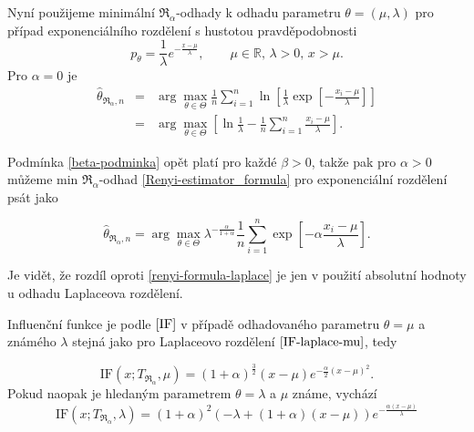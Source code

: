 Nyní použijeme minimální $\mathfrak{R}_\alpha$-odhady k odhadu parametru $\theta = (\mu,\lambda)$ pro případ exponenciálního rozdělení s hustotou pravděpodobnosti
\begin{equation}
	p_\theta = \frac{1}{\lambda} e^{-\frac{x-\mu}{\lambda}}, \qquad \mu\in \mathbb{R},\, \lambda>0, \, x>\mu.
\end{equation}
Pro $\alpha = 0$ je 
\begin{eqnarray}
	\hat{\theta}_{\mathfrak{R}_\alpha,n} & = & \arg \max_{\theta \in \Theta} \frac{1}{n} \sum^n_{i=1} \ln \left[ \frac{1}{\lambda}\exp \left[-\frac{x_i-\mu}{\lambda} \right] \right] \nonumber \\
	& = & \arg \max_{\theta \in \Theta} \left[ \ln \frac{1}{\lambda} - \frac{1}{n} \sum^n_{i=1} \frac{x_i-\mu}{\lambda} \right].
\end{eqnarray}

\noindent Podmínka \ref{beta-podminka} opět platí pro každé $\beta>0$, takže pak pro $\alpha>0$ můžeme  min $\mathfrak{R}_\alpha$-odhad \eqref{Renyi-estimator_formula} pro exponenciální rozdělení psát jako 

\begin{equation}
	\hat{\theta}_{\mathfrak{R}_\alpha,n} = \arg \max_{\theta \in \Theta} \lambda^{-\frac{\alpha}{1+\alpha}} \frac{1}{n}\sum_{i=1}^n \exp \left[-\alpha\frac{x_i-\mu}{\lambda} \right].
	\label{renyi-formula-exponential}
\end{equation}

\noindent Je vidět, že rozdíl oproti \eqref{renyi-formula-laplace} je jen v použití absolutní hodnoty u odhadu Laplaceova rozdělení. 

Influenční funkce je podle $\eqref{IF}$ v případě odhadovaného parametru $\theta = \mu$ a známého $ \lambda$ stejná jako pro Laplaceovo rozdělení $\eqref{IF-laplace-mu}$, tedy 

\begin{equation}
	\mathrm{IF}(x;T_{\mathfrak{R}_\alpha},\mu) = (1+\alpha )^{\frac{3}{2}} (x-\mu )  e^{-\frac{\alpha}{2} (x-\mu )^2}. %
	\label{IF-exponential-mu}
\end{equation}
Pokud naopak je hledaným parametrem $\theta = \lambda$ a $ \mu $ známe, vychází 
\begin{equation}
	\mathrm{IF}(x;T_{\mathfrak{R}_\alpha},\lambda) =	(1+\alpha )^2 \left( - \lambda +(1+ \alpha)(x-\mu)\right) e^{-\frac{\alpha (x-\mu)}{\lambda }} %
	\label{IF-exponential-lambda}
\end{equation}

